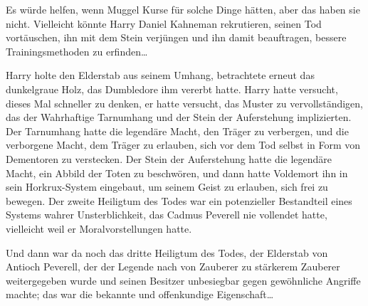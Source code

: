 Es würde helfen, wenn Muggel Kurse für solche Dinge hätten, aber das haben sie nicht.
Vielleicht könnte Harry Daniel Kahneman rekrutieren, seinen Tod vortäuschen, ihn mit dem Stein verjüngen und ihn damit beauftragen, bessere Trainingsmethoden zu erfinden…

Harry holte den Elderstab aus seinem Umhang, betrachtete erneut das dunkelgraue Holz, das Dumbledore ihm vererbt hatte. Harry hatte versucht, dieses Mal schneller zu denken, er hatte versucht, das Muster zu vervollständigen, das der Wahrhaftige Tarnumhang und der Stein der Auferstehung implizierten. Der Tarnumhang hatte die legendäre Macht, den Träger zu verbergen, und die verborgene Macht, dem Träger zu erlauben, sich vor dem Tod selbst in Form von Dementoren zu verstecken. Der Stein der Auferstehung hatte die legendäre Macht, ein Abbild der Toten zu beschwören, und dann hatte Voldemort ihn in sein Horkrux-System eingebaut, um seinem Geist zu erlauben, sich frei zu bewegen. Der zweite Heiligtum des Todes war ein potenzieller Bestandteil eines Systems wahrer Unsterblichkeit, das Cadmus Peverell nie vollendet hatte, vielleicht weil er Moralvorstellungen hatte.

Und dann war da noch das dritte Heiligtum des Todes, der Elderstab von Antioch Peverell, der der Legende nach von Zauberer zu stärkerem Zauberer weitergegeben wurde und seinen Besitzer unbesiegbar gegen gewöhnliche Angriffe machte; das war die bekannte und offenkundige Eigenschaft…

